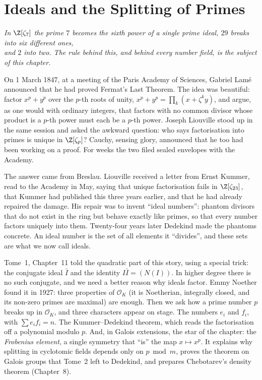 \chapter{Ideals and the Splitting of Primes}
\begin{center}\itshape
In $\Z[\zeta_7]$ the prime $7$ becomes the sixth power of a single prime ideal, $29$ breaks into six different ones,\\
and $2$ into two. The rule behind this, and behind every number field, is the subject of this chapter.
\end{center}

On 1 March 1847, at a meeting of the Paris Academy of Sciences, Gabriel Lamé announced that he had proved Fermat's Last
Theorem. The idea was beautiful: factor $x^p+y^p$ over the $p$-th roots of unity, $x^p+y^p=\prod_k(x+\zeta^ky)$, and argue,
as one would with ordinary integers, that factors with no common divisor whose product is a $p$-th power must each be a
$p$-th power. Joseph Liouville stood up in the same session and asked the awkward question: who says factorisation into
primes is unique in $\Z[\zeta_p]$? Cauchy, sensing glory, announced that he too had been working on a proof. For weeks the
two filed sealed envelopes with the Academy.

The answer came from Breslau. Liouville received a letter from Ernst Kummer, read to the Academy in May, saying that
unique factorisation fails in $\Z[\zeta_{23}]$, that Kummer had published this three years earlier, and that he had
already repaired the damage. His repair was to invent ``ideal numbers'': phantom divisors that do not exist in the ring
but behave exactly like primes, so that every number factors uniquely into them. Twenty-four years later Dedekind made the
phantoms concrete. An ideal number is the set of all elements it ``divides'', and these sets are what we now call
ideals.

Tome~1, Chapter~11 told the quadratic part of this story, using a special trick: the conjugate ideal $\bar I$ and the
identity $I\bar I=(N(I))$. In higher degree there is no such conjugate, and we need a better reason why ideals factor.
Emmy Noether found it in 1927: three properties of $\mathcal O_K$ (it is Noetherian, integrally closed, and its non-zero
primes are maximal) are enough. Then we ask how a prime number $p$ breaks up in $\mathcal O_K$, and three characters
appear on stage. The numbers $e_i$ and $f_i$, with $\sum e_if_i=n$. The Kummer--Dedekind theorem, which reads the
factorisation off a polynomial modulo $p$. And, in Galois extensions, the star of the chapter: the \emph{Frobenius
element}, a single symmetry that ``is'' the map $x\mapsto x^p$. It explains why splitting in cyclotomic fields depends only
on $p\bmod m$, proves the theorem on Galois groups that Tome~2 left to Dedekind, and prepares Chebotarev's density theorem
(Chapter~8).

